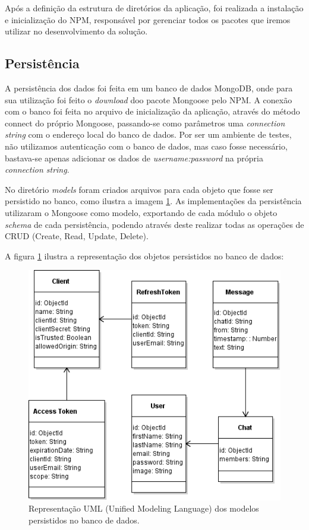 Após a definição da estrutura de diretórios da aplicação, foi realizada a instalação e inicialização do NPM, responsável por gerenciar todos os pacotes que iremos utilizar no desenvolvimento da solução.

\subsection{Persistência}
A persistência dos dados foi feita em um banco de dados MongoDB, onde para sua utilização foi feito o \textit{download} doo pacote Mongoose pelo NPM. A conexão com o banco foi feita no arquivo de inicialização da aplicação, através do método connect do próprio Mongoose, passando-se como parâmetros uma \textit{connection string} com o endereço local do banco de dados. Por ser um ambiente de testes, não utilizamos autenticação com o banco de dados, mas caso fosse necessário, bastava-se apenas adicionar os dados de \textit{username:password} na própria \textit{connection string}.

No diretório \textit{models} foram criados arquivos para cada objeto que fosse ser persistido no banco, como ilustra a imagem \ref{fig:modelsuml}. As implementações da persistência utilizaram o Mongoose como modelo, exportando de cada módulo o objeto \textit{schema} de cada persistência, podendo através deste realizar todas as operações de CRUD (Create, Read, Update, Delete).

A figura \ref{fig:modelsuml} ilustra a representação dos objetos persistidos no banco de dados:

\begin{figure}[!h]
	\centering
	\includegraphics[scale=0.85]{imagens/models_uml.png}
	\caption{\small Representação UML (Unified Modeling Language) dos modelos persistidos no banco de dados.}
	\label{fig:modelsuml}
\end{figure}

